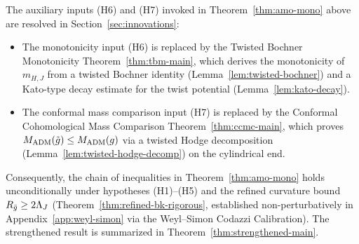 \begin{remark}\label{rem:strengthened-endpoint}
The auxiliary inputs (H6) and (H7) invoked in Theorem~\ref{thm:amo-mono} above are resolved in Section~\ref{sec:innovations}:
\begin{itemize}
    \item The monotonicity input (H6) is replaced by the Twisted Bochner Monotonicity Theorem~\ref{thm:tbm-main}, which derives the monotonicity of $m_{H,J}$ from a twisted Bochner identity (Lemma~\ref{lem:twisted-bochner}) and a Kato-type decay estimate for the twist potential (Lemma~\ref{lem:kato-decay}).
    \item The conformal mass comparison input (H7) is replaced by the Conformal Cohomological Mass Comparison Theorem~\ref{thm:ccmc-main}, which proves $M_{\mathrm{ADM}}(\tilde{g}) \leq M_{\mathrm{ADM}}(g)$ via a twisted Hodge decomposition (Lemma~\ref{lem:twisted-hodge-decomp}) on the cylindrical end.
\end{itemize}
Consequently, the chain of inequalities in Theorem~\ref{thm:amo-mono} holds unconditionally under hypotheses (H1)--(H5) and the refined curvature bound $R_{\bar{g}} \geq 2\Lambda_J$ (Theorem~\ref{thm:refined-bk-rigorous}, established non-perturbatively in Appendix~\ref{app:weyl-simon} via the Weyl--Simon Codazzi Calibration). The strengthened result is summarized in Theorem~\ref{thm:strengthened-main}.
\end{remark}

